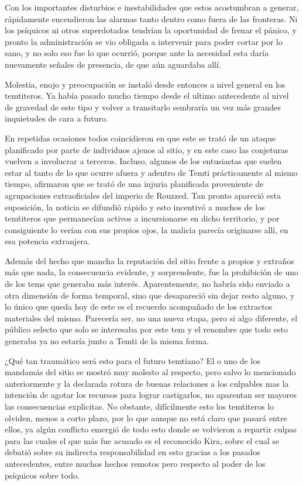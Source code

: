 \documentclass[
  spanish,
]{book}
\begin{document}
Con los importantes disturbios e inestabilidades que estos acostumbran a generar, rápidamente encendieron las alarmas tanto dentro como fuera de las fronteras. Ni los psíquicos ni otros superdotados tendrían la oportunidad de frenar el pánico, y pronto la administración se vio obligada a intervenir para poder cortar por lo sano, y no solo eso fue lo que ocurrió, porque ante la necesidad esta daría nuevamente señales de presencia, de que aún aguardaba allí.

Molestia, enojo y preocupación se instaló desde entonces a nivel general en los temtiteros. Ya había pasado mucho tiempo desde el ultimo antecedente al nivel de gravedad de este tipo y volver a transitarlo sembraría un vez más grandes inquietudes de cara a futuro.

En repetidas ocasiones todos coincidieron en que este se trató de un ataque planificado por parte de individuos ajenos al sitio, y en este caso las conjeturas vuelven a involucrar a terceros. Incluso, algunos de los entusiastas que suelen estar al tanto de lo que ocurre afuera y adentro de Temti prácticamente al mismo tiempo, afirmaron que se trató de una injuria planificada proveniente de agrupaciones extraoficiales del imperio de Rouzzed. Tan pronto apareció esta suposición, la noticia se difundió rápido y esto incentivó a muchos de los temtiteros que permanecían activos a incursionarse en dicho territorio, y por consiguiente lo verían con sus propios ojos, la malicia parecía originarse allí, en esa potencia extranjera.

Además del hecho que mancha la reputación del sitio frente a propios y extraños más que nada, la consecuencia evidente, y sorprendente, fue la prohibición de uno de los tems que generaba más interés. Aparentemente, no habría sido enviado a otra dimensión de forma temporal, sino que desapareció sin dejar resto alguno, y lo único que queda hoy de este es el recuerdo acompañado de los extractos materiales del mismo. Parecería ser, no una nueva etapa, pero si algo diferente, el público selecto que solo se interesaba por este tem y el renombre que todo esto generaba ya no estaría junto a Temti de la misma forma.

¿Qué tan traumático será esto para el futuro temtiano?
El o uno de los mandamás del sitio se mostró muy molesto al respecto, pero salvo lo mencionado anteriormente y la declarada rotura de buenas relaciones a los culpables mas la intención de agotar los recursos para lograr castigarlos, no aparentan ser mayores las consecuencias explicitas. No obstante, difícilmente esto los temtiteros lo olviden, menos a corto plazo, por lo que aunque no está claro que pasará entre ellos, ya algún conflicto emergió de todo esto donde se volvieron a repartir culpas para las cuales el que más fue acusado es el reconocido Kira, sobre el cual se debatió sobre su indirecta responsabilidad en esto gracias a los pasados antecedentes, entre muchos hechos remotos pero respecto al poder de los psíquicos sobre todo.
\end{document}
